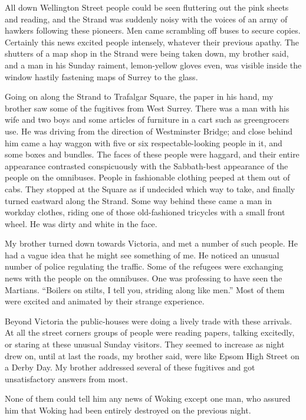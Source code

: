 All down Wellington Street people could be seen fluttering out the
pink sheets and reading, and the Strand was suddenly noisy with the
voices of an army of hawkers following these pioneers. Men came
scrambling off buses to secure copies. Certainly this news excited
people intensely, whatever their previous apathy. The shutters of a
map shop in the Strand were being taken down, my brother said, and
a man in his Sunday raiment, lemon-yellow gloves even, was visible
inside the window hastily fastening maps of Surrey to the glass.

Going on along the Strand to Trafalgar Square, the paper in his
hand, my brother saw some of the fugitives from West Surrey. There
was a man with his wife and two boys and some articles of furniture
in a cart such as greengrocers use. He was driving from the
direction of Westminster Bridge; and close behind him came a hay
waggon with five or six respectable-looking people in it, and some
boxes and bundles. The faces of these people were haggard, and
their entire appearance contrasted conspicuously with the
Sabbath-best appearance of the people on the omnibuses. People in
fashionable clothing peeped at them out of cabs. They stopped at
the Square as if undecided which way to take, and finally turned
eastward along the Strand. Some way behind these came a man in
workday clothes, riding one of those old-fashioned tricycles with a
small front wheel. He was dirty and white in the face.

My brother turned down towards Victoria, and met a number of such
people. He had a vague idea that he might see something of me. He
noticed an unusual number of police regulating the traffic. Some of
the refugees were exchanging news with the people on the omnibuses.
One was professing to have seen the Martians. ``Boilers on stilts, I
tell you, striding along like men.'' Most of them were excited and
animated by their strange experience.

Beyond Victoria the public-houses were doing a lively trade with
these arrivals. At all the street corners groups of people were
reading papers, talking excitedly, or staring at these unusual
Sunday visitors. They seemed to increase as night drew on, until at
last the roads, my brother said, were like Epsom High Street on a
Derby Day. My brother addressed several of these fugitives and got
unsatisfactory answers from most.

None of them could tell him any news of Woking except one man, who
assured him that Woking had been entirely destroyed on the previous
night.

